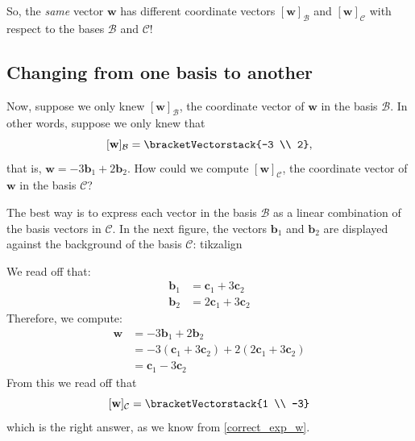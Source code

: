 \documentclass[a4paper,11pt]{book}
\theoremstyle{definition}
\newcommand{\be}{\begin{equation}}
\newcommand{\ee}{\end{equation}}
\newcommand{\ve}[1]{\mathbf{#1}}
\newcommand{\basis}[1]{{\mathcal #1}}
\newcommand{\cvector}[1]{\bracketVectorstack{#1}}
\begin{document}
So, the {\em same} vector $\ve{w}$ has different coordinate vectors $[\ve{w}]_\basis{B}$ and $[\ve{w}]_\basis{C}$ with respect to the bases $\basis{B}$ and $\basis{C}$!

\subsection{Changing from one basis to another}

Now, suppose we only knew $[\ve{w}]_\basis{B}$, the coordinate vector of $\ve{w}$ in the basis $\basis{B}$. In other words, suppose we only knew that
\[
 [\ve{w}]_\basis{B} = \cvector{-3 \\ 2} , 
\]
that is, $\ve{w} = -3 \ve{b}_1 + 2 \ve{b}_2$. How could we compute $[\ve{w}]_\basis{C}$, the coordinate vector of $\ve{w}$ in the basis $\basis{C}$?

The best way is to express each vector in the basis $\basis{B}$ as a linear combination of the basis vectors in $\basis{C}$. In the next figure, the vectors $\ve{b}_1$ and $\ve{b}_2$ are displayed against the background of the basis $\basis{C}$:
tikzalign
We read off that:
\begin{align} \label{b_in_terms_of_c}
	\ve{b}_1 &= \ve{c}_1 + 3 \ve{c}_2 \\
	\ve{b}_2 &= 2 \ve{c}_1 + 3 \ve{c}_2 \label{b_in_terms_of_c_2} 
\end{align}
Therefore, we compute: 
\begin{align*}
	\ve{w} &= -3 \ve{b}_1 + 2 \ve{b}_2 \\
	&= -3 (\ve{c}_1 + 3 \ve{c}_2) + 2(2 \ve{c}_1 + 3 \ve{c}_2) \\
	&= \ve{c}_1 - 3 \ve{c}_2
\end{align*}
From this we read off that 
\be \label{w_in_basis_C}
  [\ve{w}]_\basis{C} = \cvector{1 \\ -3}
\ee
which is the right answer, as we know from \eqref{correct_exp_w}. 
\end{document}
